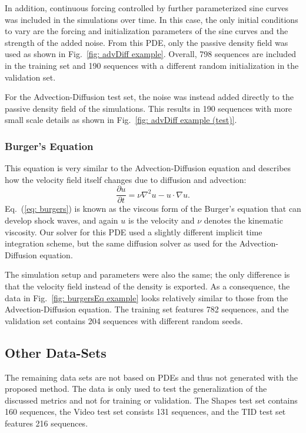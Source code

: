 In addition, continuous forcing controlled by further parameterized sine curves was included in the simulations over time. In this case, the only initial conditions to vary are the forcing and initialization parameters of the sine curves and the strength of the added noise. From this PDE, only the passive density field was used as shown in Fig.~\ref{fig: advDiff example}. Overall, 798 sequences are included in the training set and 190 sequences with a different random initialization in the validation set.

For the Advection-Diffusion test set, the noise was instead added directly to the passive density field of the simulations. This results in 190 sequences with more small scale details as shown in Fig.~\ref{fig: advDiff example (test)}.


\subsubsection*{Burger's Equation}
This equation is very similar to the Advection-Diffusion equation and describes how the velocity field itself changes due to diffusion and advection:
\begin{equation}
\frac{\partial u}{\partial t} = \nu \nabla^2 u - u \cdot \nabla u.
\label{eq: burgers}
\end{equation}
Eq.~(\ref{eq: burgers}) is known as the viscous form of the Burger's equation that can develop shock waves, and again $u$ is the velocity and $\nu$ denotes the kinematic viscosity. Our solver for this PDE used a slightly different implicit time integration scheme, but the same diffusion solver as used for the Advection-Diffusion equation.

The simulation setup and parameters were also the same; the only difference is that the velocity field instead of the density is exported. As a consequence, the data in Fig.~\ref{fig: burgersEq example} looks relatively similar to those from the Advection-Diffusion equation. The training set features 782 sequences, and the validation set contains 204 sequences with different random seeds.


\subsection{Other Data-Sets}
The remaining data sets are not based on PDEs and thus not generated with the proposed method. The data is only used to test the generalization of the discussed metrics and not for training or validation. The Shapes test set contains 160 sequences, the Video test set consists 131 sequences, and the TID test set features 216 sequences.

